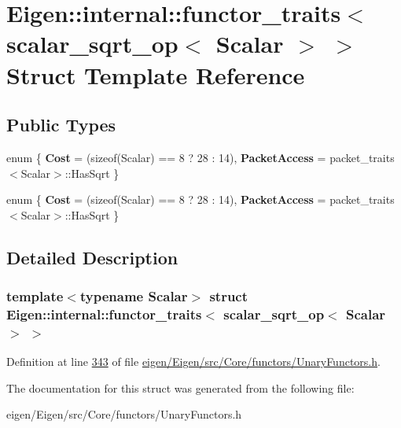\hypertarget{struct_eigen_1_1internal_1_1functor__traits_3_01scalar__sqrt__op_3_01_scalar_01_4_01_4}{}\section{Eigen\+:\+:internal\+:\+:functor\+\_\+traits$<$ scalar\+\_\+sqrt\+\_\+op$<$ Scalar $>$ $>$ Struct Template Reference}
\label{struct_eigen_1_1internal_1_1functor__traits_3_01scalar__sqrt__op_3_01_scalar_01_4_01_4}
\subsection*{Public Types}
\begin{DoxyCompactItemize}
\item 
\mbox{\label{struct_eigen_1_1internal_1_1functor__traits_3_01scalar__sqrt__op_3_01_scalar_01_4_01_4_a318ee0d242c4baa51eeec34388bb5f2d}} 
enum \{ {\bfseries Cost} = (sizeof(Scalar) == 8 ? 28 \+: 14), 
{\bfseries Packet\+Access} = packet\+\_\+traits$<$Scalar$>$\+:\+:Has\+Sqrt
 \}
\item 
\mbox{\label{struct_eigen_1_1internal_1_1functor__traits_3_01scalar__sqrt__op_3_01_scalar_01_4_01_4_a2e558128b56d51b90f405b087f233875}} 
enum \{ {\bfseries Cost} = (sizeof(Scalar) == 8 ? 28 \+: 14), 
{\bfseries Packet\+Access} = packet\+\_\+traits$<$Scalar$>$\+:\+:Has\+Sqrt
 \}
\end{DoxyCompactItemize}


\subsection{Detailed Description}
\subsubsection*{template$<$typename Scalar$>$\newline
struct Eigen\+::internal\+::functor\+\_\+traits$<$ scalar\+\_\+sqrt\+\_\+op$<$ Scalar $>$ $>$}



Definition at line \hyperlink{eigen_2_eigen_2src_2_core_2functors_2_unary_functors_8h_source_l00343}{343} of file \hyperlink{eigen_2_eigen_2src_2_core_2functors_2_unary_functors_8h_source}{eigen/\+Eigen/src/\+Core/functors/\+Unary\+Functors.\+h}.



The documentation for this struct was generated from the following file\+:\begin{DoxyCompactItemize}
\item 
eigen/\+Eigen/src/\+Core/functors/\+Unary\+Functors.\+h\end{DoxyCompactItemize}
